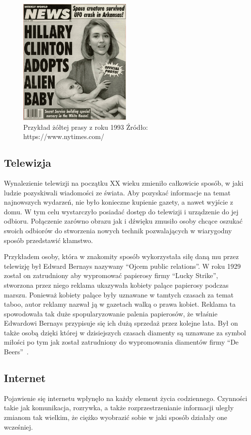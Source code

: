 \begin{figure}[h!]
    \centering
    \includegraphics[width=0.5\textwidth]{./Img/fake-newspaper.jpg}
    \caption{Przykład żółtej prasy z roku 1993 Źródło: https://www.nytimes.com/}
\end{figure}

\subsection{Telewizja}
Wynalezienie telewizji na początku XX wieku zmieniło całkowicie sposób, w jaki ludzie pozyskiwali wiadomości ze świata.
Aby pozyskać informacje na temat najnowszych wydarzeń, nie było konieczne kupienie gazety, a nawet 
wyjście z domu. W tym celu wystarczyło posiadać dostęp do telewizji i urządzenie do jej odbioru. Połączenie zarówno obrazu
jak i dźwięku zmusiło osoby chcące oszukać swoich odbiorów do stworzenia nowych technik 
pozwalających w wiarygodny sposób przedstawić kłamstwo.

Przykładem osoby, która w znakomity sposób wykorzystała siłę daną mu przez telewizję był Edward Bernays
nazywany ``Ojcem public relations''.
W roku 1929 został on zatrudniony aby wypromować papierosy firmy ``Lucky Strike'',
stworzona przez niego reklama ukazywała kobiety palące papierosy podczas marszu. 
Ponieważ kobiety palące były uznawane w tamtych czasach za temat
taboo, autor reklamy nazwał ją w gazetach walką o prawa kobiet. Reklama ta spowodowała tak duże 
spopularyzowanie palenia papierosów, że właśnie Edwardowi Bernays przypisuje się
ich dużą sprzedaż przez kolejne lata.
Był on także osobą dzięki której w dzisiejszych czasach diamenty są uznawane za symbol miłości po tym jak
został zatrudniony do wypromowania diamentów firmy ``De Beers''~\cite{MarkDice}.

\subsection{Internet}
Pojawienie się internetu wpłynęło na każdy element życia codziennego. Czynności takie jak komunikacja, rozrywka,
a także rozprzestrzenianie informacji uległy zmianom tak wielkim, że ciężko wyobrazić sobie w jaki sposób działały
one wcześniej. 

